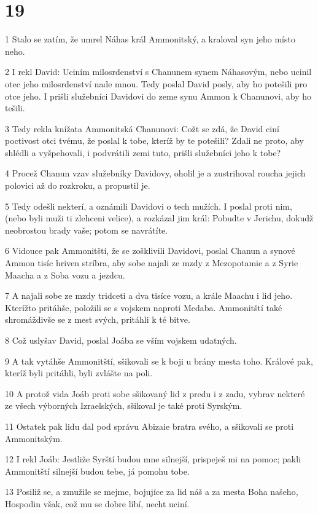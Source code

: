 \chapter{19}

\par 1 Stalo se zatím, že umrel Náhas král Ammonitský, a kraloval syn jeho místo neho.
\par 2 I rekl David: Uciním milosrdenství s Chanunem synem Náhasovým, nebo ucinil otec jeho milosrdenství nade mnou. Tedy poslal David posly, aby ho potešili pro otce jeho. I prišli služebníci Davidovi do zeme synu Ammon k Chanunovi, aby ho tešili.
\par 3 Tedy rekla knížata Ammonitská Chanunovi: Cožt se zdá, že David ciní poctivost otci tvému, že poslal k tobe, kteríž by te potešili? Zdali ne proto, aby shlédli a vyšpehovali, i podvrátili zemi tuto, prišli služebníci jeho k tobe?
\par 4 Procež Chanun vzav služebníky Davidovy, oholil je a zustrihoval roucha jejich polovici až do rozkroku, a propustil je.
\par 5 Tedy odešli nekterí, a oznámili Davidovi o tech mužích. I poslal proti nim, (nebo byli muži ti zlehceni velice), a rozkázal jim král: Pobudte v Jerichu, dokudž neobrostou brady vaše; potom se navrátíte.
\par 6 Vidouce pak Ammonitští, že se zošklivili Davidovi, poslal Chanun a synové Ammon tisíc hriven stríbra, aby sobe najali ze mzdy z Mezopotamie a z Syrie Maacha a z Soba vozu a jezdcu.
\par 7 A najali sobe ze mzdy tridceti a dva tisíce vozu, a krále Maachu i lid jeho. Kterížto pritáhše, položili se s vojskem naproti Medaba. Ammonitští také shromáždivše se z mest svých, pritáhli k té bitve.
\par 8 Což uslyšav David, poslal Joába se vším vojskem udatných.
\par 9 A tak vytáhše Ammonitští, sšikovali se k boji u brány mesta toho. Králové pak, kteríž byli pritáhli, byli zvlášte na poli.
\par 10 A protož vida Joáb proti sobe sšikovaný lid z predu i z zadu, vybrav nekteré ze všech výborných Izraelských, sšikoval je také proti Syrským.
\par 11 Ostatek pak lidu dal pod správu Abizaie bratra svého, a sšikovali se proti Ammonitským.
\par 12 I rekl Joáb: Jestliže Syrští budou mne silnejší, prispeješ mi na pomoc; pakli Ammonitští silnejší budou tebe, já pomohu tobe.
\par 13 Posiliž se, a zmužile se mejme, bojujíce za lid náš a za mesta Boha našeho, Hospodin však, což mu se dobre líbí, necht uciní.
